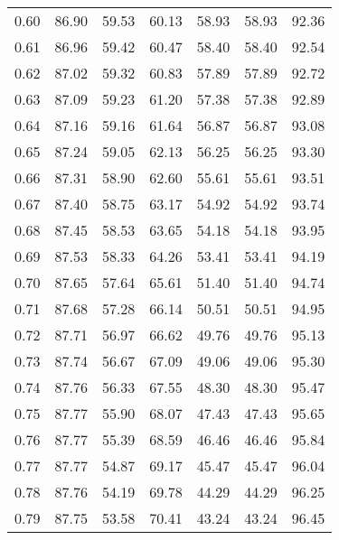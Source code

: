 \begin{tabular}{|c|c|c|c|c|c|c|}
      0.60 &     86.90 &     59.53 &      60.13 &   58.93 &      58.93 &         92.36 \\
      0.61 &     86.96 &     59.42 &      60.47 &   58.40 &      58.40 &         92.54 \\
      0.62 &     87.02 &     59.32 &      60.83 &   57.89 &      57.89 &         92.72 \\
      0.63 &     87.09 &     59.23 &      61.20 &   57.38 &      57.38 &         92.89 \\
      0.64 &     87.16 &     59.16 &      61.64 &   56.87 &      56.87 &         93.08 \\
      0.65 &     87.24 &     59.05 &      62.13 &   56.25 &      56.25 &         93.30 \\
      0.66 &     87.31 &     58.90 &      62.60 &   55.61 &      55.61 &         93.51 \\
      0.67 &     87.40 &     58.75 &      63.17 &   54.92 &      54.92 &         93.74 \\
      0.68 &     87.45 &     58.53 &      63.65 &   54.18 &      54.18 &         93.95 \\
      0.69 &     87.53 &     58.33 &      64.26 &   53.41 &      53.41 &         94.19 \\
      0.70 &     87.65 &     57.64 &      65.61 &   51.40 &      51.40 &         94.74 \\
      0.71 &     87.68 &     57.28 &      66.14 &   50.51 &      50.51 &         94.95 \\
      0.72 &     87.71 &     56.97 &      66.62 &   49.76 &      49.76 &         95.13 \\
      0.73 &     87.74 &     56.67 &      67.09 &   49.06 &      49.06 &         95.30 \\
      0.74 &     87.76 &     56.33 &      67.55 &   48.30 &      48.30 &         95.47 \\
      0.75 &     87.77 &     55.90 &      68.07 &   47.43 &      47.43 &         95.65 \\
      0.76 &     87.77 &     55.39 &      68.59 &   46.46 &      46.46 &         95.84 \\
      0.77 &     87.77 &     54.87 &      69.17 &   45.47 &      45.47 &         96.04 \\
      0.78 &     87.76 &     54.19 &      69.78 &   44.29 &      44.29 &         96.25 \\
      0.79 &     87.75 &     53.58 &      70.41 &   43.24 &      43.24 &         96.45 \\

\end{tabular}
